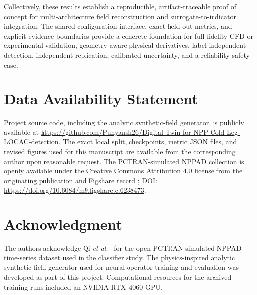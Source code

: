 \documentclass[journal]{IEEEtran}
\newcommand{\added}[1]{#1}
\begin{document}
\added{Collectively, these results establish a reproducible, artifact-traceable proof of concept for multi-architecture field reconstruction and surrogate-to-indicator integration. The shared configuration interface, exact held-out metrics, and explicit evidence boundaries provide a concrete foundation for full-fidelity CFD or experimental validation, geometry-aware physical derivatives, label-independent detection, independent replication, calibrated uncertainty, and a reliability safety case.}

\section*{Data Availability Statement}
\added{Project source code, including the analytic synthetic-field generator, is publicly available at \url{https://github.com/Punyansh26/Digital-Twin-for-NPP-Cold-Leg-LOCAC-detection}. The exact local split, checkpoints, metric JSON files, and revised figures used for this manuscript are available from the corresponding author upon reasonable request. The PCTRAN-simulated NPPAD collection is openly available under the Creative Commons Attribution 4.0 license from the originating publication and Figshare record \cite{qi2022nppad}; DOI: \url{https://doi.org/10.6084/m9.figshare.c.6238473}.}

\section*{Acknowledgment}
\added{The authors acknowledge Qi \emph{et al.}~\cite{qi2022nppad} for the open PCTRAN-simulated NPPAD time-series dataset used in the classifier study. The physics-inspired analytic synthetic field generator used for neural-operator training and evaluation was developed as part of this project. Computational resources for the archived training runs included an NVIDIA RTX~4060 GPU.}
\end{document}
